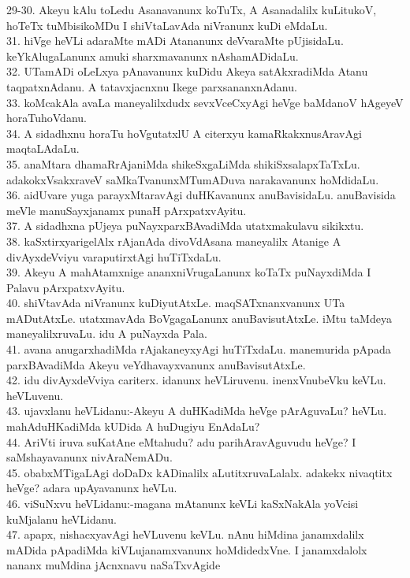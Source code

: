 \documentclass{article}
\begin{document}
29-30. Akeyu kAlu toLedu Asanavanunx koTuTx, A Asanadalilx kuLitukoV, hoTeTx tuMbisikoMDu I shiVtaLavAda niVranunx kuDi eMdaLu.\\
31. hiVge heVLi adaraMte mADi Atananunx deVvaraMte pUjisidaLu. keYkAlugaLanunx amuki sharxmavanunx nAshamADidaLu.\\
32. UTamADi oLeLxya pAnavanunx kuDidu Akeya satAkxradiMda Atanu taqpatxnAdanu. A tatavxjacnxnu Ikege parxsananxnAdanu.\\
33. koMcakAla avaLa maneyalilxdudx sevxVceCxyAgi heVge baMdanoV hAgeyeV horaTuhoVdanu.\\
34. A sidadhxnu horaTu hoVgutatxlU A citerxyu kamaRkakxnusAravAgi maqtaLAdaLu.\\
35. anaMtara dhamaRrAjaniMda shikeSxgaLiMda shikiSxsalapxTaTxLu. adakokxVsakxraveV saMkaTvanunxMTumADuva narakavanunx hoMdidaLu.\\
36. aidUvare yuga parayxMtaravAgi duHKavanunx anuBavisidaLu. anuBavisida meVle manuSayxjanamx punaH pArxpatxvAyitu.\\
37. A sidadhxna pUjeya puNayxparxBAvadiMda utatxmakulavu sikikxtu.\\
38. kaSxtirxyarigelAlx rAjanAda divoVdAsana maneyalilx Atanige A divAyxdeVviyu varaputirxtAgi huTiTxdaLu.\\
39. Akeyu A mahAtamxnige ananxniVrugaLanunx koTaTx puNayxdiMda I Palavu pArxpatxvAyitu.\\
40. shiVtavAda niVranunx kuDiyutAtxLe. maqSATxnanxvanunx UTa mADutAtxLe. utatxmavAda BoVgagaLanunx anuBavisutAtxLe. iMtu taMdeya maneyalilxruvaLu. idu A puNayxda Pala.\\
41. avana anugarxhadiMda rAjakaneyxyAgi huTiTxdaLu. manemurida pApada parxBAvadiMda Akeyu veYdhavayxvanunx anuBavisutAtxLe.\\
42. idu divAyxdeVviya cariterx. idanunx heVLiruvenu. inenxVnubeVku keVLu. heVLuvenu.\\
43. ujavxlanu heVLidanu:-Akeyu A duHKadiMda heVge pArAguvaLu? heVLu. mahAduHKadiMda kUDida A huDugiyu EnAdaLu?\\
44. AriVti iruva suKatAne eMtahudu? adu parihAravAguvudu heVge? I saMshayavanunx nivAraNemADu.\\
45. obabxMTigaLAgi doDaDx kADinalilx aLutitxruvaLalalx. adakekx nivaqtitx heVge? adara upAyavanunx heVLu.\\
46. viSuNxvu heVLidanu:-magana mAtanunx keVLi kaSxNakAla yoVcisi kuMjalanu heVLidanu.\\
47. apapx, nishacxyavAgi heVLuvenu keVLu. nAnu hiMdina janamxdalilx mADida pApadiMda kiVLujanamxvanunx hoMdidedxVne. I janamxdalolx nananx muMdina jAcnxnavu naSaTxvAgide\\
\end{document}
